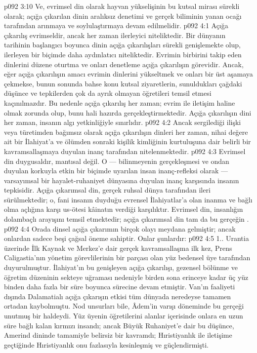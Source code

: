 \vs p092 3:10 Ve, evrimsel din olarak hayvan yükselişinin bu kutsal mirası sürekli olarak; açığa çıkarılan dinin aralıksız denetimi ve gerçek biliminin yanan ocağı tarafından arınmaya ve soylulaştırmaya devam edilmelidir.
\vs p092 4:1 Açığa çıkarılış evrimseldir, ancak her zaman ilerleyici niteliktedir. Bir dünyanın tarihinin başlangıcı boyunca dinin açığa çıkarılışları sürekli genişlemekte olup, ilerleyen bir biçimde daha aydınlatıcı niteliktedir. Evrimin birbirini takip eden dinlerini düzene oturtma ve onları denetleme açığa çıkarılışın görevidir. Ancak, eğer açığa çıkarılışın amacı evrimin dinlerini yükseltmek ve onları bir üst aşamaya çekmekse, bunun sonunda bahse konu kutsal ziyaretlerin, sunuldukları çağdaki düşünce ve tepkilerden çok da ayrık olmayan öğretileri temsil etmesi kaçınılmazdır. Bu nedenle açığa çıkarılış her zaman; evrim ile iletişim haline olmak zorunda olup, bunu hali hazırda gerçekleştirmektedir. Açığa çıkarılışın dini her zaman, insanın algı yetkinliğiyle sınırlıdır.
\vs p092 4:2 Ancak sergilediği ilişki veya türetimden bağımsız olarak açığa çıkarılışın dinleri her zaman, nihai değere ait bir İlahiyat’a ve ölümden sonraki kişilik kimliğinin kurtuluşuna dair belirli bir kavramsallaşmaya duyulan inanç tarafından nitelenmektedir.
\vs p092 4:3 Evrimsel din duygusaldır, mantısal değil. O --- bilinmeyenin gerçekleşmesi ve ondan duyulan korkuyla etkin bir biçimde uyarılan insan inanç\hyp{}refleksi olarak --- varsayımsal bir hayalet\hyp{}ruhaniyet dünyasına duyulan inanç karşısında insanın tepkisidir. Açığa çıkarımsal din, gerçek ruhsal dünya tarafından ileri sürülmektedir; o, fani insanın duyduğu evrensel İlahiyatlar’a olan inanma ve bağlı olma açlığına karşı us\hyp{}ötesi kâinatın verdiği karşılıktır. Evrimsel din, insanlığın dolambaçlı arayışını temsil etmektedir; açığa çıkarımsal din tam da bu gerçeğin .
\vs p092 4:4 Orada dinsel açığa çıkarımın birçok olayı meydana gelmiştir; ancak onlardan sadece beşi çağsal öneme sahiptir. Onlar şunlardır:
\vs p092 4:5 1.\bibnobreakspace {}. Urantia üzerinde İlk Kaynak ve Merkez’e dair gerçek kavramsallaşma ilk kez, Prens Caligastia’nın yönetim görevlilerinin bir parçası olan yüz bedensel üye tarafından duyurulmuştur. İlahiyat’ın bu genişleyen açığa çıkarılışı, gezensel bölünme ve öğretim düzeninin sekteye uğraması nedeniyle birden sona erinceye kadar üç yüz binden daha fazla bir süre boyunca sürecine devam etmiştir. Van’ın faaliyeti dışında Dalamatialı açığa çıkarışın etkisi tüm dünyada neredeyse tamamen ortadan kaybolmuştu. Nod unsurları bile, Âdem’in varışı döneminde bu gerçeği unutmuş bir haldeydi. Yüz üyenin öğretilerini alanlar içerisinde onlara en uzun süre bağlı kalan kırmızı insandı; ancak Büyük Ruhaniyet’e dair bu düşünce, Amerind dininde tamamiyle belirsiz bir kavramdı; Hıristiyanlık ile iletişime geçtiğinde Hıristiyanlık onu fazlasıyla kesinleşmiş ve güçlendirmişti.
